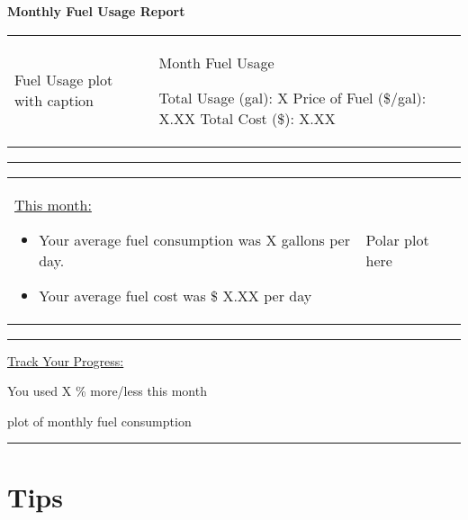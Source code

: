 \documentclass[12pt,a4paper]{article}
\begin{document}
\begin{center}

\textbf{\Huge{Monthly Fuel Usage Report}}

\end{center}

\begin{center}


\end{center}

\vspace{12pt}

\begin{tabu}{X|X}

Fuel Usage plot with caption

&

Month Fuel Usage

Total Usage (gal): X
Price of Fuel (\$/gal): X.XX
Total Cost (\$): X.XX

\end{tabu}

\vspace{12pt}
\rule{\textwidth}{1pt}
\vspace{12pt}

\begin{tabu}{XX}

\underline{This month:}

\begin{itemize}

\item Your average fuel consumption was X gallons per day.
\item Your average fuel cost was \$ X.XX per day

\end{itemize}

&

Polar plot here

\end{tabu}

\vspace{12pt}
\rule{\textwidth}{1pt}
\vspace{12pt}

\underline{Track Your Progress:}

You used X \% more/less this month

plot of monthly fuel consumption

\vspace{12pt}
\rule{\textwidth}{1pt}
\vspace{12pt}

\section*{Tips}

\end{document}
